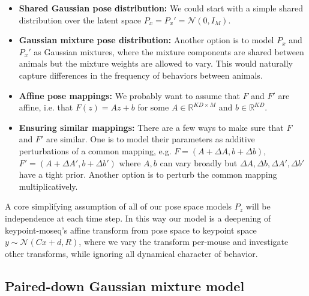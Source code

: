 \documentclass{article}         %
\newcommand{\NN}{\mathcal{N}}
\begin{document}
\begin{itemize}
    \item \textbf{Shared Gaussian pose distribution:} We could start with a simple shared distribution over the latent space $P_x = P_x' = \mathcal{N}(0, I_M)$. 
    \item  \textbf{Gaussian mixture pose distribution:} Another option is to model $P_x$ and $P_x'$ as Gaussian mixtures, where the mixture components are shared between animals but the mixture weights are allowed to vary. This would naturally capture differences in the frequency of behaviors between animals.
    \item \textbf{Affine pose mappings:} We probably want to assume that $F$ and $F'$ are affine, i.e. that $F(z) = Az + b$ for some $A \in \mathbb{R}^{KD \times M}$ and $b \in \mathbb{R}^{KD}$. 
    \item \textbf{Ensuring similar mappings:} There are a few ways to make sure that $F$ and $F'$ are similar. One is to model their parameters as additive perturbations of a common mapping, e.g. $F = (A + \Delta A, b + \Delta b)$, $F' = (A + \Delta A', b + \Delta b')$ where $A,b$ can vary broadly but $\Delta A, \Delta b, \Delta A', \Delta b'$ have a tight prior. Another option is to perturb the common mapping multiplicatively.
\end{itemize}

A core simplifying assumption of all of our pose space models $P_z$ will be independence at each time step. In this way our model is a deepening of keypoint-moseq's affine transform from pose space to keypoint space $y \sim \NN(Cx+d, R)$, where we vary the transform per-mouse and investigate other transforms, while ignoring all dynamical character of behavior.

\label{sec:paired-down-gmm}
\subsection{Paired-down Gaussian mixture model}
\end{document}
